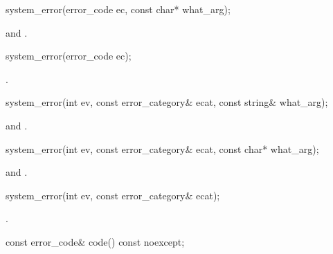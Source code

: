 %
\begin{itemdecl}
system_error(error_code ec, const char* what_arg);
\end{itemdecl}

\begin{itemdescr}
\pnum
\ensures
{} and
.
\end{itemdescr}

%
\begin{itemdecl}
system_error(error_code ec);
\end{itemdecl}

\begin{itemdescr}
\pnum
\ensures
{}.
\end{itemdescr}

%
\begin{itemdecl}
system_error(int ev, const error_category& ecat, const string& what_arg);
\end{itemdecl}

\begin{itemdescr}
\pnum
\ensures
\raggedright {} and\linebreak
{}.
\end{itemdescr}

%
\begin{itemdecl}
system_error(int ev, const error_category& ecat, const char* what_arg);
\end{itemdecl}

\begin{itemdescr}
\pnum
\ensures
\raggedright {} and\linebreak
{}.
\end{itemdescr}

%
\begin{itemdecl}
system_error(int ev, const error_category& ecat);
\end{itemdecl}

\begin{itemdescr}
\pnum
\ensures
{}.
\end{itemdescr}

%
\begin{itemdecl}
const error_code& code() const noexcept;
\end{itemdecl}

